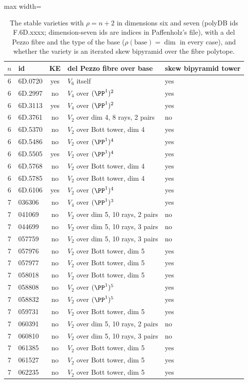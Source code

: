 \begin{table}[ht]
\centering
\begin{adjustbox}{max width=\textwidth}
\begin{tabular}{clcll}
\toprule
$n$ & id & KE & del Pezzo fibre over base & skew bipyramid tower \\
\midrule
6 & 6D.0720 & yes & $V_6$ itself & yes \\
6 & 6D.2997 & no & $V_4$ over $(\PP^1)^2$ & yes \\
6 & 6D.3113 & yes & $V_4$ over $(\PP^1)^2$ & yes \\
6 & 6D.3761 & no & $V_2$ over dim 4, 8 rays, 2 pairs & no \\
6 & 6D.5370 & no & $V_2$ over Bott tower, dim 4 & yes \\
6 & 6D.5486 & no & $V_2$ over $(\PP^1)^4$ & yes \\
6 & 6D.5505 & yes & $V_2$ over $(\PP^1)^4$ & yes \\
6 & 6D.5768 & no & $V_2$ over Bott tower, dim 4 & yes \\
6 & 6D.5785 & no & $V_2$ over Bott tower, dim 4 & yes \\
6 & 6D.6106 & yes & $V_2$ over $(\PP^1)^4$ & yes \\
7 & 036306 & no & $V_4$ over $(\PP^1)^3$ & yes \\
7 & 041069 & no & $V_2$ over dim 5, 10 rays, 2 pairs & no \\
7 & 044699 & no & $V_2$ over dim 5, 10 rays, 3 pairs & no \\
7 & 057759 & no & $V_2$ over dim 5, 10 rays, 3 pairs & no \\
7 & 057976 & no & $V_2$ over Bott tower, dim 5 & yes \\
7 & 057977 & no & $V_2$ over Bott tower, dim 5 & yes \\
7 & 058018 & no & $V_2$ over Bott tower, dim 5 & yes \\
7 & 058808 & no & $V_2$ over $(\PP^1)^5$ & yes \\
7 & 058832 & no & $V_2$ over $(\PP^1)^5$ & yes \\
7 & 059731 & no & $V_2$ over Bott tower, dim 5 & yes \\
7 & 060391 & no & $V_2$ over dim 5, 10 rays, 2 pairs & no \\
7 & 060810 & no & $V_2$ over dim 5, 10 rays, 3 pairs & no \\
7 & 061385 & no & $V_2$ over Bott tower, dim 5 & yes \\
7 & 061527 & no & $V_2$ over Bott tower, dim 5 & yes \\
7 & 062235 & no & $V_2$ over Bott tower, dim 5 & yes \\
\bottomrule
\end{tabular}
\end{adjustbox}
\caption{The stable varieties with $\rho = n+2$ in dimensions six and seven (polyDB ids F.6D.xxxx; dimension-seven ids are indices in Paffenholz's file), with a del Pezzo fibre and the type of the base ($\rho(\text{base}) = \dim$ in every case), and whether the variety is an iterated skew bipyramid over the fibre polytope.}
\label{tab:boundary}
\end{table}
